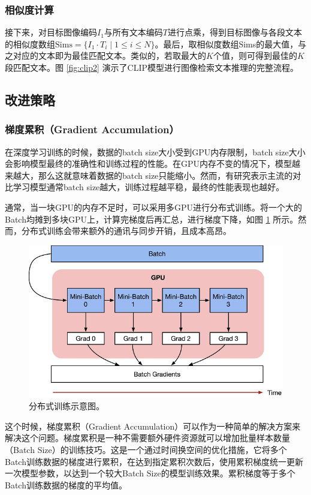 \documentclass[a4paper]{zreport}
\begin{document}
\subsubsection{相似度计算}

接下来，对目标图像编码$I_1$与所有文本编码$T$进行点乘，得到目标图像与各段文本的相似度数组$\mathrm{Sims} = \{I_1 \cdot T_i \mid 1 \le i \le N\}$。最后，取相似度数组Sims的最大值，与之对应的文本即为最佳匹配文本。类似的，若取最大的$K$个值，则可得到最佳的$K$段匹配文本。图 \ref{fig:clip2} 演示了CLIP模型进行图像检索文本推理的完整流程。

\subsection{改进策略}

\subsubsection{梯度累积（Gradient Accumulation）}

在深度学习训练的时候，数据的batch size大小受到GPU内存限制，batch size大小会影响模型最终的准确性和训练过程的性能。在GPU内存不变的情况下，模型越来越大，那么这就意味着数据的batch size只能缩小。然而，有研究表示主流的对比学习模型通常batch size越大，训练过程越平稳，最终的性能表现也越好。

通常，当一块GPU的内存不足时，可以采用多GPU进行分布式训练。将一个大的Batch均摊到多块GPU上，计算完梯度后再汇总，进行梯度下降，如图 \ref{fig:grad} 所示。然而，分布式训练会带来额外的通讯与同步开销，且成本高昂。

\begin{figure}[h]
\centering
\includegraphics[width=0.9\linewidth]{figures/grad}
\caption{分布式训练示意图。}
\label{fig:grad}
\end{figure}


这个时候，梯度累积（Gradient Accumulation）可以作为一种简单的解决方案来解决这个问题。梯度累积是一种不需要额外硬件资源就可以增加批量样本数量（Batch Size）的训练技巧。这是一个通过时间换空间的优化措施，它将多个Batch训练数据的梯度进行累积，在达到指定累积次数后，使用累积梯度统一更新一次模型参数，以达到一个较大Batch Size的模型训练效果。累积梯度等于多个Batch训练数据的梯度的平均值。
\end{document}
